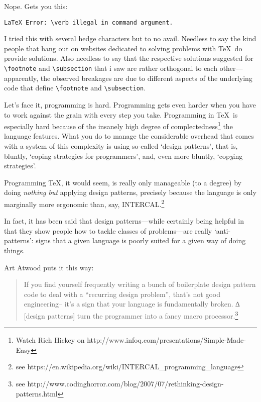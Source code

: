 Nope. Gets you this:

\begin{verbatim}
LaTeX Error: \verb illegal in command argument.
\end{verbatim}

I tried this with several hedge characters but to no avail. Needless to say the kind people that hang out on
websites dedicated to solving problems with \TeX\ do provide solutions. Also needless to say that the
respective solutions suggested for \verb#\footnote# and \verb#\subsection# that i saw are rather orthogonal
to each other---apparently, the observed breakages are due to different aspects of the underlying code that
define \verb#\footnote# and \verb#\subsection#.

Let's face it, programming is hard. Programming gets even harder when you have to work against the grain
with every step you take. Programming in \TeX\ is especially hard because of the insanely high degree of
complectedness\thinspace\footnote{Watch Rich Hickey on http://www.infoq.com/presentations/Simple-Made-Easy}
the language features. What you do to manage the considerable overhead that comes with a system of this
complexity is using so-called `design patterns', that is, bluntly, `coping strategies for programmers',
and, even more bluntly, `cop{\em y}ing strategies'.

Programming \TeX, it would seem, is
really only manageable (to a degree) by doing {\em nothing but} applying design patterns, precisely because
the language is only marginally more ergonomic than, say, INTERCAL.\footnote{see
https://en.wikipedia.org/wiki/INTERCAL\_programming\_language}

In fact, it has been said that design patterns---while certainly being
helpful in that they show people how to tackle classes of problems---are really `anti-patterns': signs that
a given language is poorly suited for a given way of doing things.

Art Atwood puts it this way:

\begin{quote}If you find yourself frequently writing a bunch of boilerplate design pattern code to deal with
a ``recurring design problem'', that's not good engineering-- it's a sign that your language is fundamentally
broken. ∆ [design patterns] turn the programmer into a fancy macro processor.\footnote{see
http://www.codinghorror.com/blog/2007/07/rethinking-design-patterns.html}\end{quote}

